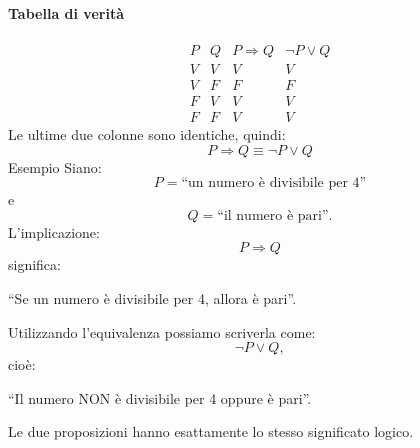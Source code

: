 \paragraph{Tabella di verità}
\[
\begin{array}{c|c|c|c}
P & Q & P \Rightarrow Q & \neg P \lor Q \\ \hline
V & V & V & V \\
V & F & F & F \\
F & V & V & V \\
F & F & V & V
\end{array}
\]
Le ultime due colonne sono identiche, quindi:
\[
\boxed{
P \Rightarrow Q
\equiv
\neg P \lor Q
}
\]
\textcolor{verdeEsempio}{Esempio}
Siano:
\[
P = \text{``un numero è divisibile per 4''}
\]
e
\[
Q = \text{``il numero è pari''}.
\]
L'implicazione:
\[
P \Rightarrow Q
\]
significa:
\begin{center}
``Se un numero è divisibile per 4, allora è pari''.
\end{center}
Utilizzando l'equivalenza possiamo scriverla come:
\[
\neg P \lor Q,
\]
cioè:
\begin{center}
``Il numero NON è divisibile per 4 oppure è pari''.
\end{center}
Le due proposizioni hanno esattamente lo stesso significato logico.